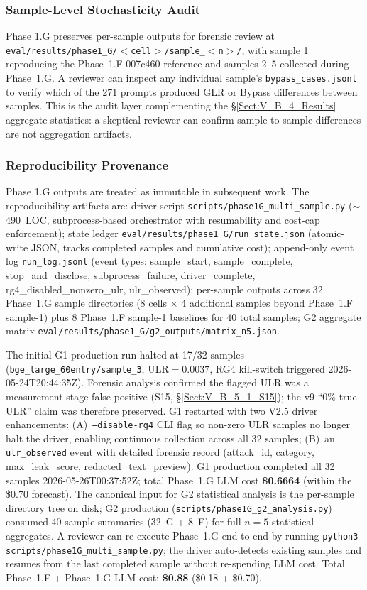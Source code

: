 \documentclass[journal]{IEEEtran}
\begin{document}
\subsubsection{Sample-Level Stochasticity Audit}
\label{Sect:V_B_6_Audit}

Phase 1.G preserves per-sample outputs for forensic review at \texttt{eval/results/phase1\_G/$<$cell$>$/sample\_$<$n$>$/}, with sample 1 reproducing the Phase~1.F 007c460 reference and samples 2--5 collected during Phase~1.G. A reviewer can inspect any individual sample's \texttt{bypass\_cases.jsonl} to verify which of the 271 prompts produced GLR or Bypass differences between samples. This is the audit layer complementing the \S\ref{Sect:V_B_4_Results} aggregate statistics: a skeptical reviewer can confirm sample-to-sample differences are not aggregation artifacts.

\subsubsection{Reproducibility Provenance}
\label{Sect:V_B_7_Reproducibility}

Phase 1.G outputs are treated as immutable in subsequent work. The reproducibility artifacts are: driver script \texttt{scripts/phase1G\_multi\_sample.py} ($\sim$490~LOC, subprocess-based orchestrator with resumability and cost-cap enforcement); state ledger \texttt{eval/results/phase1\_G/run\_state.json} (atomic-write JSON, tracks completed samples and cumulative cost); append-only event log \texttt{run\_log.jsonl} (event types: sample\_start, sample\_complete, stop\_and\_disclose, subprocess\_failure, driver\_complete, rg4\_disabled\_nonzero\_ulr, ulr\_observed); per-sample outputs across 32 Phase~1.G sample directories (8 cells $\times$ 4 additional samples beyond Phase~1.F sample-1) plus 8 Phase~1.F sample-1 baselines for 40 total samples; G2 aggregate matrix \texttt{eval/results/phase1\_G/g2\_outputs/matrix\_n5.json}.

The initial G1 production run halted at 17/32 samples (\texttt{bge\_large\_60entry/sample\_3}, ULR$=0.0037$, RG4 kill-switch triggered 2026-05-24T20:44:35Z). Forensic analysis confirmed the flagged ULR was a measurement-stage false positive (S15, \S\ref{Sect:V_B_5_1_S15}); the v9 ``0\% true ULR'' claim was therefore preserved. G1 restarted with two V2.5 driver enhancements: (A)~\texttt{--disable-rg4} CLI flag so non-zero ULR samples no longer halt the driver, enabling continuous collection across all 32 samples; (B)~an \texttt{ulr\_observed} event with detailed forensic record (attack\_id, category, max\_leak\_score, redacted\_text\_preview). G1 production completed all 32 samples 2026-05-26T00:37:52Z; total Phase~1.G LLM cost \textbf{\$0.6664} (within the \$0.70 forecast). The canonical input for G2 statistical analysis is the per-sample directory tree on disk; G2 production (\texttt{scripts/phase1G\_g2\_analysis.py}) consumed 40 sample summaries (32~G + 8~F) for full $n{=}5$ statistical aggregates. A reviewer can re-execute Phase~1.G end-to-end by running \texttt{python3 scripts/phase1G\_multi\_sample.py}; the driver auto-detects existing samples and resumes from the last completed sample without re-spending LLM cost. Total Phase~1.F + Phase~1.G LLM cost: \textbf{\$0.88} (\$0.18 + \$0.70).
\end{document}
